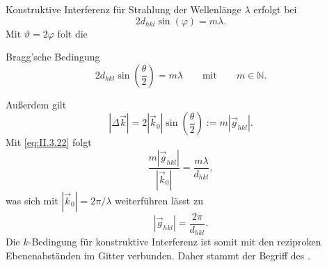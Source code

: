 	Konstruktive Interferenz für Strahlung der Wellenlänge $\lambda$ erfolgt bei
	$$
	2d_{hkl}  \sin\left( \varphi \right)  = m \lambda.
	$$
	Mit $\vartheta=2\varphi$ folt die 
	\begin{important}
		Bragg'sche Bedingung\\
		\begin{equation}
			\label{eq:II.3.22}
			2 d_{hkl} \sin\left( \frac{\theta}{2} \right) = m\lambda \qquad\text{mit}\qquad m \in \mathbb{N}.
		\end{equation}
	\end{important}
	Außerdem gilt
	$$
	| \Delta \Vec{k} | = 2 | \Vec{k}_{0} | \sin\left( \frac{\theta}{2} \right)  := m | \Vec{g}_{hkl}|.
	$$  
	Mit \eqref{eq:II.3.22} folgt
	$$
	\frac{m | \Vec{g}_{hkl}|}{| \Vec{k}_{0}| } = \frac{m \lambda}{d_{hkl}},
	$$ 
	was sich mit $ | \Vec{k}_{0} | = 2\pi / \lambda$ weiterführen lässt zu
	$$
	| \Vec{g}_{hkl}| = \frac{2\pi}{d_{hkl}}.
	$$
	Die $k$-Bedingung für konstruktive Interferenz ist somit mit den reziproken Ebenenabständen im Gitter verbunden.
	Daher stammt der Begriff des .

